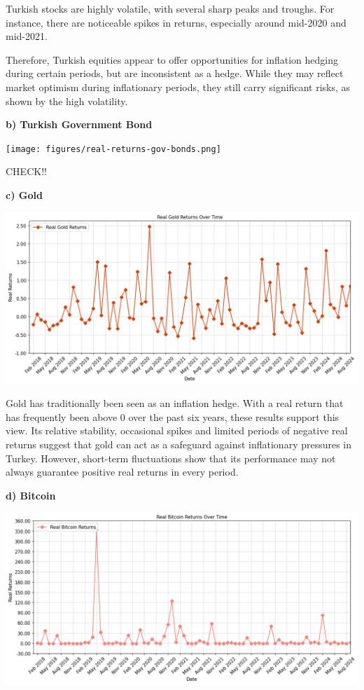 \documentclass[
]{article}
\begin{document}
Turkish stocks are highly volatile, with several sharp peaks and troughs. For instance, there are noticeable spikes in returns, especially around mid-2020 and mid-2021.

Therefore, Turkish equities appear to offer opportunities for inflation hedging during certain periods, but are inconsistent as a hedge. While they may reflect market optimism during inflationary periods, they still carry significant risks, as shown by the high volatility.

\textbf{b) Turkish Government Bond}

\texttt{[image: figures/real-returns-gov-bonds.png]}

CHECK!!

\textbf{c) Gold}

\includegraphics[width=\textwidth]{figures/real-returns-gold.png}

Gold has traditionally been seen as an inflation hedge. With a real return that has frequently been above 0 over the past six years, these results support this view. Its relative stability, occasional spikes and limited periods of negative real returns suggest that gold can act as a safeguard against inflationary pressures in Turkey. However, short-term fluctuations show that its performance may not always guarantee positive real returns in every period.

\textbf{d) Bitcoin}

\includegraphics[width=\textwidth]{figures/real-returns-bitcoin.png}
\end{document}
